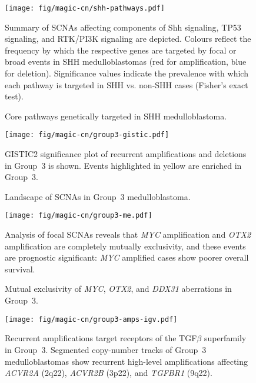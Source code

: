 \documentclass[11pt,letterpaper]{article}
\theoremstyle{definition}
\begin{document}
\begin{figure}[h]
	\begin{center}
		\texttt{[image: fig/magic-cn/shh-pathways.pdf]}
	\end{center}
	\caption{Core pathways genetically targeted in SHH medulloblastoma.}
	Summary of SCNAs affecting components of Shh signaling, TP53 signaling, and RTK/PI3K signaling are depicted. Colours reflect the frequency by which the respective genes are targeted by focal or broad events in SHH medulloblastomas (red for amplification, blue for deletion). Significance values indicate the prevalence with which each pathway is targeted in SHH vs. non-SHH cases (Fisher's exact test).
	\label{fig:shh-pathways}
\end{figure}

\clearpage

\begin{figure}[h]
	\begin{center}
		\texttt{[image: fig/magic-cn/group3-gistic.pdf]}
	\end{center}
	\caption{Landscape of SCNAs in Group~3 medulloblastoma.}
	GISTIC2 significance plot of recurrent amplifications and deletions in Group~3 is shown. Events highlighted in yellow are enriched in Group~3.
	\label{fig:group3-gistic}
\end{figure}

\clearpage

\begin{figure}[h]
	\begin{center}
		\texttt{[image: fig/magic-cn/group3-me.pdf]}
	\end{center}
	\caption{Mutual exclusivity of \emph{MYC}, \emph{OTX2}, and \emph{DDX31} aberrations in Group~3.}
	Analysis of focal SCNAs reveals that \emph{MYC} amplification and \emph{OTX2} amplification are completely mutually exclusivity, and these events are prognostic significant: \emph{MYC} amplified cases show poorer overall survival.
	\label{fig:group3-me}
\end{figure}

\begin{SCfigure}
	\centering
	\texttt{[image: fig/magic-cn/group3-amps-igv.pdf]}
	\caption{Recurrent amplifications target receptors of the TGF$\beta$ superfamily in Group~3.
		Segmented copy-number tracks of Group~3 medulloblastomas show recurrent high-level amplifications affecting \emph{ACVR2A} (2q22), \emph{ACVR2B} (3p22), and \emph{TGFBR1} (9q22).}
	\label{fig:group3-amps-igv}
\end{SCfigure}
\end{document}
